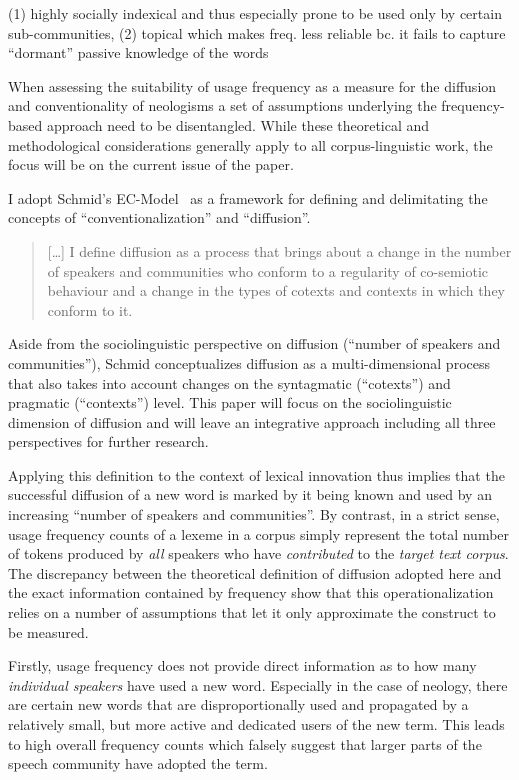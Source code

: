 \documentclass[a4paper, abstract=on]{scrartcl}
\begin{document}
        (1) highly socially indexical and thus especially prone to be used only by certain sub-communities,
        (2) topical which makes freq. less reliable bc. it fails to capture \enquote{dormant} passive knowledge of the words

    When assessing the suitability of usage frequency as a measure for the diffusion and conventionality of neologisms a set of assumptions underlying the frequency-based approach need to be disentangled. While these theoretical and methodological considerations generally apply to all corpus-linguistic work, the focus will be on the current issue of the paper.

    I adopt Schmid's EC-Model~\parencite{Schmid2020} as a framework for defining and delimitating the concepts of \enquote{conventionalization} and \enquote{diffusion}.

    \begin{quote}
      [\dots] I define diffusion as a process that brings about a change in the number of speakers and communities who conform to a regularity of co-semiotic behaviour and a change in the types of cotexts and contexts in which they conform to it.
    \end{quote}

    Aside from the sociolinguistic perspective on diffusion (\enquote{number of speakers and communities}), Schmid conceptualizes diffusion as a multi-dimensional process that also takes into account changes on the syntagmatic (\enquote{cotexts}) and pragmatic (\enquote{contexts}) level. This paper will focus on the sociolinguistic dimension of diffusion and will leave an integrative approach including all three perspectives for further research.

    Applying this definition to the context of lexical innovation thus implies that the successful diffusion of a new word is marked by it being known and used by an increasing \enquote{number of speakers and communities}. By contrast, in a strict sense, usage frequency counts of a lexeme in a corpus simply represent the total number of tokens produced by \emph{all} speakers who have \emph{contributed} to the \emph{target text corpus}. The discrepancy between the theoretical definition of diffusion adopted here and the exact information contained by frequency show that this operationalization relies on a number of assumptions that let it only approximate the construct to be measured.

    Firstly, usage frequency does not provide direct information as to how many \emph{individual speakers} have used a new word. Especially in the case of neology, there are certain new words that are disproportionally used and propagated by a relatively small, but more active and dedicated users of the new term. This leads to high overall frequency counts which falsely suggest that larger parts of the speech community have adopted the term.
\end{document}
